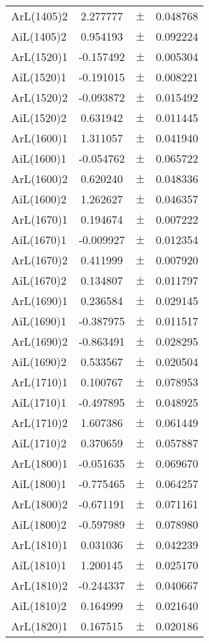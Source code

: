 \begin{table}
\begin{tiny}
\begin{tabular}{lccc}
ArL(1405)2 & 2.277777 & $\pm$ & 0.048768 \\
AiL(1405)2 & 0.954193 & $\pm$ & 0.092224 \\
ArL(1520)1 & -0.157492 & $\pm$ & 0.005304 \\
AiL(1520)1 & -0.191015 & $\pm$ & 0.008221 \\
ArL(1520)2 & -0.093872 & $\pm$ & 0.015492 \\
AiL(1520)2 & 0.631942 & $\pm$ & 0.011445 \\
ArL(1600)1 & 1.311057 & $\pm$ & 0.041940 \\
AiL(1600)1 & -0.054762 & $\pm$ & 0.065722 \\
ArL(1600)2 & 0.620240 & $\pm$ & 0.048336 \\
AiL(1600)2 & 1.262627 & $\pm$ & 0.046357 \\
ArL(1670)1 & 0.194674 & $\pm$ & 0.007222 \\
AiL(1670)1 & -0.009927 & $\pm$ & 0.012354 \\
ArL(1670)2 & 0.411999 & $\pm$ & 0.007920 \\
AiL(1670)2 & 0.134807 & $\pm$ & 0.011797 \\
ArL(1690)1 & 0.236584 & $\pm$ & 0.029145 \\
AiL(1690)1 & -0.387975 & $\pm$ & 0.011517 \\
ArL(1690)2 & -0.863491 & $\pm$ & 0.028295 \\
AiL(1690)2 & 0.533567 & $\pm$ & 0.020504 \\
ArL(1710)1 & 0.100767 & $\pm$ & 0.078953 \\
AiL(1710)1 & -0.497895 & $\pm$ & 0.048925 \\
ArL(1710)2 & 1.607386 & $\pm$ & 0.061449 \\
AiL(1710)2 & 0.370659 & $\pm$ & 0.057887 \\
ArL(1800)1 & -0.051635 & $\pm$ & 0.069670 \\
AiL(1800)1 & -0.775465 & $\pm$ & 0.064257 \\
ArL(1800)2 & -0.671191 & $\pm$ & 0.071161 \\
AiL(1800)2 & -0.597989 & $\pm$ & 0.078980 \\
ArL(1810)1 & 0.031036 & $\pm$ & 0.042239 \\
AiL(1810)1 & 1.200145 & $\pm$ & 0.025170 \\
ArL(1810)2 & -0.244337 & $\pm$ & 0.040667 \\
AiL(1810)2 & 0.164999 & $\pm$ & 0.021640 \\
ArL(1820)1 & 0.167515 & $\pm$ & 0.020186 \\

\end{tabular}
\end{tiny}
\end{table}
